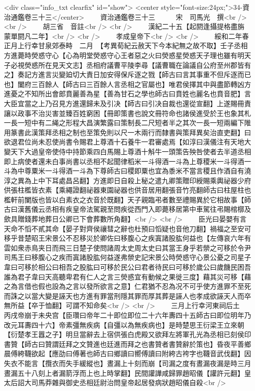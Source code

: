 <div class="info_txt clearfix" id="show">
<center style="font-size:24px;">34-資治通鑑卷三十三</center>
  　　資治通鑑卷三十三　　　宋　司馬光　撰<br />
<br />
　　胡三省　音註<br />
<br />
　　漢紀二十五【起閼逢攝提格盡旃蒙單閼凡二年】<br />
<br />
　　孝成皇帝下<br />
<br />
　　綏和二年春正月上行幸甘泉郊泰畤　二月　【考異荀紀云赦天下今本紀無之故不取】壬子丞相方進薨時熒惑守心【心為明堂熒惑守心王者惡之火曰熒惑星熒惑天子理也雖有明天子必視熒惑所在見天文志】丞相府議曹平陵李尋【議曹職在論議自公府至州郡皆有之】奏記方進言災變廹切大責日加安得保斥逐之戮【師古曰言其事重不但斥逐而已也】闔府三百餘人【師古曰三百餘人言丞相之官屬也】唯君侯擇其中與盡節轉凶方進憂之不知所出會郎賁麗善為星【善為甘石之學也師古曰賁姓也麗名也賁音肥】言大臣宜當之上乃召見方進還歸未及引决【師古曰引决自裁也還從宣翻】上遂賜冊責讓以政事不治災害並臻百姓窮困【冊即策書也說文冊符命也諸侯進受於王也象其札一長一短中有二䋲之形程大昌演繁露曰策制長二尺短者半之其次一長一短兩編下陮用篆書此漢策拜丞相之制也至策免則以尺一木兩行而隸書與策拜異矣治直吏翻】曰欲退君位尚未忍使尚書令賜君上尊酒十石養牛一君審處焉【如淳曰漢儀注有天地大變天下大過皇帝使侍中持節乘四白馬賜上尊酒十斛牛一頭策告殃咎使者去半道丞相即上病使者還未白事尚書以丞相不起聞律稻米一斗得酒一斗為上尊稷米一斗得酒一斗為中尊粟米一斗得酒一斗為下尊師古曰稷即粟也宜為黍米不當言稷且作酒自有澆淳之異為上中下耳處昌呂翻】方進即日自殺上秘之遣九卿策贈印綬賜乘輿祕器少府供張柱檻皆衣素【乘繩證翻祕器東園祕器也供音居用翻張音竹亮翻師古曰柱屋柱也檻軒前闌版也皆以白素衣之衣音於既翻】天子親臨弔者數至禮賜異於它相故事【師古曰漢舊儀云丞相有疾皇帝法駕親至問疾從西門入即薨移居第中車駕往弔賜棺槨及歛具贈錢葬地葬日公卿已下會葬數所角翻】<br />
<br />
　　臣光曰晏嬰有言天命不慆不貳其命【晏子對齊侯禳彗之辭也杜預曰慆疑也音他刀翻】禍福之至安可移乎昔楚昭王宋景公不忍移災於卿佐曰移腹心之疾寘諸股肱何益也【左傳哀六年有雲如衆赤鳥夹日而飛三日楚子使問諸周太史周太史曰其當王身乎若禜之可移於令尹司馬王曰移腹心之疾而寘諸股肱何益遂弗禜史記宋景公時熒惑守心景公憂之司星子韋曰可移於相公曰相吾之股肱曰可移於民公曰君者待民曰可移於歲公曰歲饑民困吾誰為君子韋曰天高聽卑君有仁人之言三熒惑宜有動候之果徙三度】藉其災可移【藉之為言借也假也設為之言以發所欲言之意】仁君猶不忍為况不可乎使方進罪不至死而誅之以當大變是誣天也方進有罪當刑隱其罪而厚其葬是誣人也孝成欲誣天人而卒無所益【卒于恤翻】可謂不知命矣<br />
<br />
　　三月上行幸河東祠后土　丙戌帝崩于未央宫【臣瓚曰帝年二十即位即位二十六年夀四十五師古曰即位明年乃改元耳夀四十六】帝素彊無疾病【自彊以為無疾病也】是時楚思王衍梁王立來朝【衍楚孝王囂之子】明旦當辭去上宿供張白虎殿又欲拜左將軍孔光為丞相已刻侯印書贊【師古曰贊謂廷拜之文贊進也廷進而拜之也書贊者書贊辭於策也】昏夜平善鄉晨傅絝韈欲起【應劭曰傅著也師古曰鄉讀曰嚮傅讀曰附絝古袴字也韈音武伐翻】因失衣不能言【攬衣而失手緩縱也】晝漏上十刻而崩【司漏之度有晝漏夜漏是時三月晝漏五十八刻上者漏箭浮而上也上時掌翻】民間讙譁咸歸罪趙昭儀【讙許元翻】皇太后詔大司馬莽雜與御史丞相廷尉治問皇帝起居發病狀趙昭儀自殺<br />

